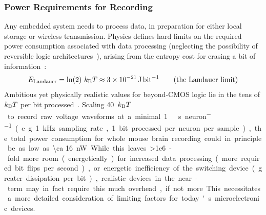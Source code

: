 \subsubsection{Power Requirements for Recording}

Any embedded system needs to process data, in preparation for either local storage or wireless transmission.
Physics defines hard limits on the required power consumption associated with data processing (neglecting the possibility of reversible logic architectures~\cite{bennett73}), arising from the entropy cost for erasing a bit of information~\cite{landauer61}:
\[E\sub{Landauer} = \ln(2)\ \kb T\approx \SI{3e-21}{\joule\per\bit} \tag{the Landauer limit}\]
Ambitious yet physically realistic values for beyond-CMOS logic lie in the tens of $k_{\text{\scriptsize B}} T$ per bit processed~\cite{yablonovitch08}.
Scaling \SI{40}{$k_{\text{\scriptsize B}} T$\per\bit} to record raw voltage waveforms at a minimal \SI{1}{\kilo\bit\per\second\per neuron} (e.g. \SI{1}{\kilo\hertz} sampling rate, 1 bit processed per neuron per sample), the total power consumption for whole mouse brain recording could in principle be as low as \SI{\ca 16}{\nano\watt}. While this leaves \num{>1e6}-fold more room (energetically) for increased data processing (more required bit flips per second), or energetic inefficiency of the switching device (greater dissipation per bit), realistic devices in the near-term may in fact require this much overhead, if not more.
This necessitates a more detailed consideration of limiting factors for today's microelectronic devices.

